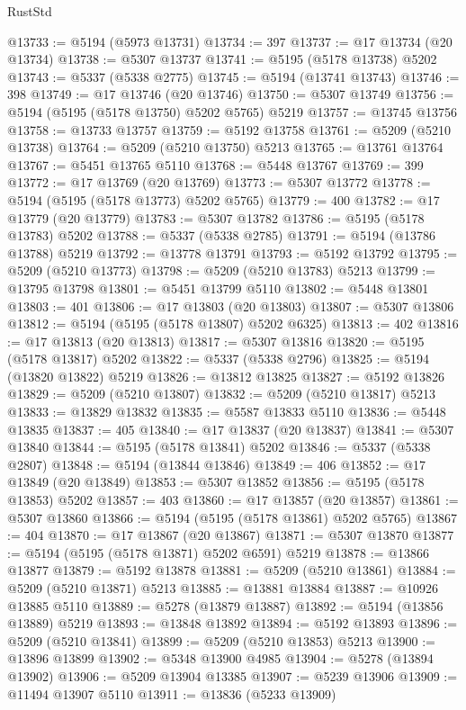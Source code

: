 \begin{lexlean}{RustStd}
\begin{coremodule}
@13733 := @5194 (@5973 @13731)
@13734 := 397
@13737 := @17 @13734 (@20 @13734)
@13738 := @5307 @13737
@13741 := @5195 (@5178 @13738) @5202
@13743 := @5337 (@5338 @2775)
@13745 := @5194 (@13741 @13743)
@13746 := 398
@13749 := @17 @13746 (@20 @13746)
@13750 := @5307 @13749
@13756 := @5194 (@5195 (@5178 @13750) @5202 @5765) @5219
@13757 := @13745 @13756
@13758 := @13733 @13757
@13759 := @5192 @13758
@13761 := @5209 (@5210 @13738)
@13764 := @5209 (@5210 @13750) @5213
@13765 := @13761 @13764
@13767 := @5451 @13765 @5110
@13768 := @5448 @13767
@13769 := 399
@13772 := @17 @13769 (@20 @13769)
@13773 := @5307 @13772
@13778 := @5194 (@5195 (@5178 @13773) @5202 @5765)
@13779 := 400
@13782 := @17 @13779 (@20 @13779)
@13783 := @5307 @13782
@13786 := @5195 (@5178 @13783) @5202
@13788 := @5337 (@5338 @2785)
@13791 := @5194 (@13786 @13788) @5219
@13792 := @13778 @13791
@13793 := @5192 @13792
@13795 := @5209 (@5210 @13773)
@13798 := @5209 (@5210 @13783) @5213
@13799 := @13795 @13798
@13801 := @5451 @13799 @5110
@13802 := @5448 @13801
@13803 := 401
@13806 := @17 @13803 (@20 @13803)
@13807 := @5307 @13806
@13812 := @5194 (@5195 (@5178 @13807) @5202 @6325)
@13813 := 402
@13816 := @17 @13813 (@20 @13813)
@13817 := @5307 @13816
@13820 := @5195 (@5178 @13817) @5202
@13822 := @5337 (@5338 @2796)
@13825 := @5194 (@13820 @13822) @5219
@13826 := @13812 @13825
@13827 := @5192 @13826
@13829 := @5209 (@5210 @13807)
@13832 := @5209 (@5210 @13817) @5213
@13833 := @13829 @13832
@13835 := @5587 @13833 @5110
@13836 := @5448 @13835
@13837 := 405
@13840 := @17 @13837 (@20 @13837)
@13841 := @5307 @13840
@13844 := @5195 (@5178 @13841) @5202
@13846 := @5337 (@5338 @2807)
@13848 := @5194 (@13844 @13846)
@13849 := 406
@13852 := @17 @13849 (@20 @13849)
@13853 := @5307 @13852
@13856 := @5195 (@5178 @13853) @5202
@13857 := 403
@13860 := @17 @13857 (@20 @13857)
@13861 := @5307 @13860
@13866 := @5194 (@5195 (@5178 @13861) @5202 @5765)
@13867 := 404
@13870 := @17 @13867 (@20 @13867)
@13871 := @5307 @13870
@13877 := @5194 (@5195 (@5178 @13871) @5202 @6591) @5219
@13878 := @13866 @13877
@13879 := @5192 @13878
@13881 := @5209 (@5210 @13861)
@13884 := @5209 (@5210 @13871) @5213
@13885 := @13881 @13884
@13887 := @10926 @13885 @5110
@13889 := @5278 (@13879 @13887)
@13892 := @5194 (@13856 @13889) @5219
@13893 := @13848 @13892
@13894 := @5192 @13893
@13896 := @5209 (@5210 @13841)
@13899 := @5209 (@5210 @13853) @5213
@13900 := @13896 @13899
@13902 := @5348 @13900 @4985
@13904 := @5278 (@13894 @13902)
@13906 := @5209 @13904 @13385
@13907 := @5239 @13906
@13909 := @11494 @13907 @5110
@13911 := @13836 (@5233 @13909)

\end{coremodule}
\end{lexlean}
